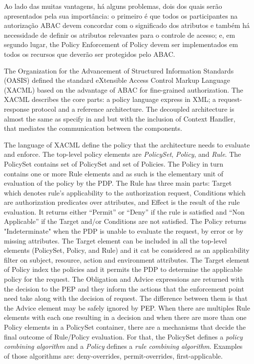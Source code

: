 \documentclass{doublecol-new}
\begin{document}
Ao lado das muitas vantagens, há alguns problemas, dois dos quais serão apresentados pela sua importância: o primeiro é que todos os participantes na autorização ABAC devem concordar com o significado dos atributos \citep{karp2010abac,Rubio-Medrano2015federated} e também há necessidade de definir os atributos relevantes para o controle de acesso; e, em segundo lugar, the Policy Enforcement of Policy devem ser implementados em todos os recursos que deverão ser protegidos pelo ABAC.

The Organization for the Advancement of Structured Information Standards (OASIS) defined the standard eXtensible Access Control Markup Language (XACML)\cite{rissanen2013extensible} based on the advantage of ABAC for fine-grained authorization. The XACML describes the core parts: a policy language express in XML; a request-response protocol and a reference architecture. The decoupled architecture is almost the same as specify in \cite{huABAC2014guide} and \cite{itut1996acframework} but with the inclusion of Context Handler, that mediates the communication between the components.

The language of XACML define the policy that the architecture needs to evaluate and enforce. The top-level policy elements are \textit{PolicySet}, \textit{Policy}, and \textit{Rule}. The PolicySet contains set of PolicySet and set of Policies. The Policy in turn contains one or more Rule elements and as such is the elementary unit of evaluation of the policy by the PDP. The Rule has three main parts: Target which denotes rule’s applicability to the authorization request, Conditions which are authorization predicates over attributes, and Effect is the result of the rule evaluation. It returns either “Permit” or “Deny” if the rule is satisfied and “Non Applicable” if the Target and/or Conditions are not satisfied. The Policy returns "Indeterminate" when the PDP is unable to evaluate the request, by error or by missing attributes. The Target element can be included in all the top-level elements (PolicySet, Policy, and Rule) and it cat be considered as an applicability filter on subject, resource, action and environment attributes. The Target element of Policy index the policies and it permits the PDP to determine the applicable policy for the request. The Obligation and Advice expressions are returned with the decision to the PEP and they inform the actions that the enforcement point need take along with the decision of request. The difference between them is that the Advice element may be safely ignored by PEP. When there are multiples Rule elements with each one resulting in a decision and when there are more than one Policy elements in a PolicySet container, there are a mechanisms that decide the final outcome of Rule/Policy evaluation. For that, the PolicySet defines a \textit{policy combining algorithm} and a \textit{Policy} defines a \textit{rule combining algorithm}. Examples of those algorithms are: deny-overrides, permit-overrides, first-applicable.
	
\end{document}
